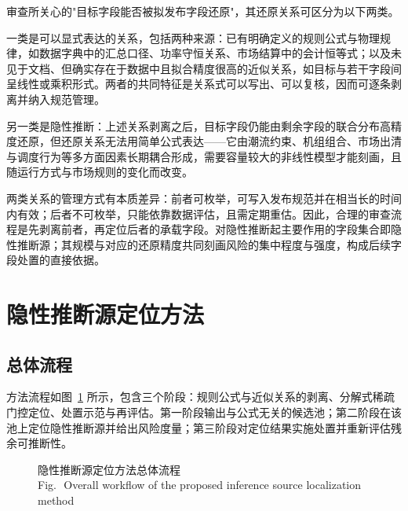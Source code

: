 \documentclass[UTF8,zihao=5,twoside,fontset=none]{ctexart}
\newcommand{\figbicaption}[2]{\caption{#1\\[-0.2em]\small Fig.\,\thefigure\ #2}}
\begin{document}
审查所关心的"目标字段能否被拟发布字段还原"，其还原关系可区分为以下两类。

一类是可以显式表达的关系，包括两种来源：已有明确定义的规则公式与物理规律，如数据字典中的汇总口径、功率守恒关系、市场结算中的会计恒等式；以及未见于文档、但确实存在于数据中且拟合精度很高的近似关系，如目标与若干字段间呈线性或乘积形式。两者的共同特征是关系式可以写出、可以复核，因而可逐条剥离并纳入规范管理。

另一类是隐性推断：上述关系剥离之后，目标字段仍能由剩余字段的联合分布高精度还原，但还原关系无法用简单公式表达——它由潮流约束、机组组合、市场出清与调度行为等多方面因素长期耦合形成，需要容量较大的非线性模型才能刻画，且随运行方式与市场规则的变化而改变。

两类关系的管理方式有本质差异：前者可枚举，可写入发布规范并在相当长的时间内有效；后者不可枚举，只能依靠数据评估，且需定期重估。因此，合理的审查流程是先剥离前者，再定位后者的承载字段。对隐性推断起主要作用的字段集合即隐性推断源；其规模与对应的还原精度共同刻画风险的集中程度与强度，构成后续字段处置的直接依据。

\section{隐性推断源定位方法}

\subsection{总体流程}

方法流程如图~\ref{fig:flow} 所示，包含三个阶段：规则公式与近似关系的剥离、分解式稀疏门控定位、处置示范与再评估。第一阶段输出与公式无关的候选池；第二阶段在该池上定位隐性推断源并给出风险度量；第三阶段对定位结果实施处置并重新评估残余可推断性。

\begin{figure}[!tbp]
\centering
{}
\figbicaption{隐性推断源定位方法总体流程}{Overall workflow of the proposed inference source localization method}
\label{fig:flow}
\end{figure}
\end{document}
